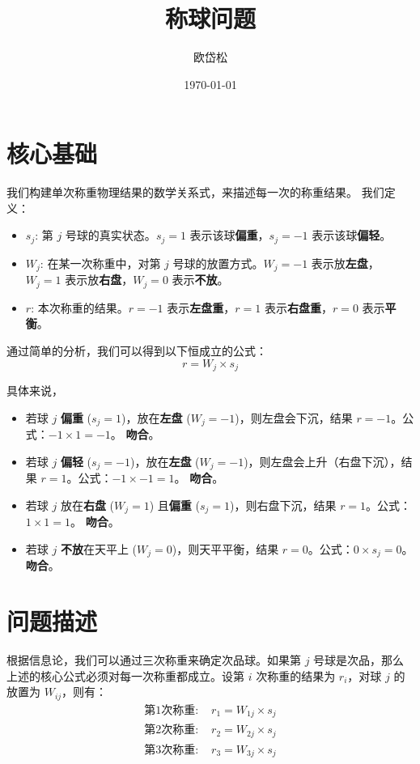 \documentclass[12pt, a4paper]{ctexart}
\title{称球问题}
\author{欧岱松}
\date{\today}
\begin{document}
\maketitle

\section{核心基础}

我们构建单次称重物理结果的数学关系式，来描述每一次的称重结果。
我们定义：
\begin{itemize}
    \item $s_j$: 第 $j$ 号球的真实状态。$s_j=1$ 表示该球\textbf{偏重}，$s_j=-1$ 表示该球\textbf{偏轻}。
    \item $W_j$: 在某一次称重中，对第 $j$ 号球的放置方式。$W_j=-1$ 表示放\textbf{左盘}，$W_j=1$ 表示放\textbf{右盘}，$W_j=0$ 表示\textbf{不放}。
    \item $r$: 本次称重的结果。$r=-1$ 表示\textbf{左盘重}，$r=1$ 表示\textbf{右盘重}，$r=0$ 表示\textbf{平衡}。
\end{itemize}
通过简单的分析，我们可以得到以下恒成立的公式：
\begin{equation}
    r = W_j \times s_j
\end{equation}

具体来说，
\begin{itemize}
    \item 若球 $j$ \textbf{偏重} ($s_j=1$)，放在\textbf{左盘} ($W_j=-1$)，则左盘会下沉，结果 $r=-1$。公式：$-1 \times 1 = -1$。 \textbf{吻合}。
    \item 若球 $j$ \textbf{偏轻} ($s_j=-1$)，放在\textbf{左盘} ($W_j=-1$)，则左盘会上升（右盘下沉），结果 $r=1$。公式：$-1 \times -1 = 1$。 \textbf{吻合}。
    \item 若球 $j$ 放在\textbf{右盘} ($W_j=1$) 且\textbf{偏重} ($s_j=1$)，则右盘下沉，结果 $r=1$。公式：$1 \times 1 = 1$。 \textbf{吻合}。
    \item 若球 $j$ \textbf{不放}在天平上 ($W_j=0$)，则天平平衡，结果 $r=0$。公式：$0 \times s_j = 0$。 \textbf{吻合}。
\end{itemize}

\section{问题描述}

根据信息论，我们可以通过三次称重来确定次品球。如果第 $j$ 号球是次品，那么上述的核心公式必须对每一次称重都成立。设第 $i$ 次称重的结果为 $r_i$，对球 $j$ 的放置为 $W_{ij}$，则有：
\begin{align*}
    \text{第1次称重: } & r_1 = W_{1j} \times s_j \\
    \text{第2次称重: } & r_2 = W_{2j} \times s_j \\
    \text{第3次称重: } & r_3 = W_{3j} \times s_j
\end{align*}
\end{document}
